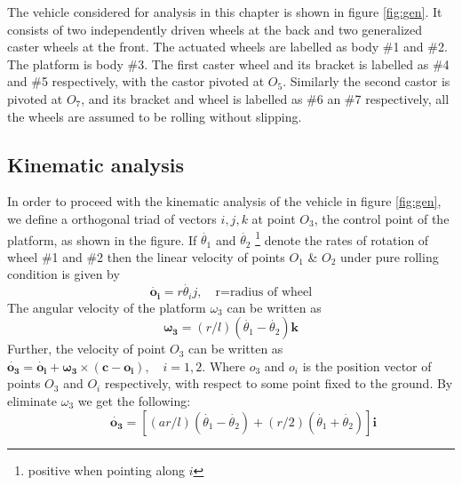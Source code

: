  The vehicle considered for analysis in this chapter is shown in figure \ref{fig:gen}. It consists of two independently driven wheels at the back and two generalized caster wheels at the front. The actuated wheels are labelled as body \#1 and \#2. The platform is body \#3. The first caster wheel and its bracket is labelled as \#4 and \#5 respectively, with the castor pivoted at $O_5$. Similarly the second castor is pivoted at $O_7$, and its bracket and wheel is labelled as \#6 an \#7 respectively, all the wheels are assumed to be rolling without slipping.  
\subsection{Kinematic analysis}
In order to proceed with the kinematic analysis of the vehicle in figure \ref{fig:gen}, we define a orthogonal triad of vectors ${i,j,k}$ at point $O_3$, the control point of the platform, as shown in the figure. If $\dot{\theta_1}$ and $\dot{\theta_2}$ \footnote{ positive when pointing along $i$} denote the rates of rotation of wheel \#1 and \#2 then the linear velocity of points $O_1$ \& $O_2$ under pure rolling condition is given by 
\begin{equation}
\label{velO1}
\bm{\dot{o_i}}=r\dot{\theta_i}j, \quad \text{r=radius of wheel}
\end{equation}
The angular velocity of the platform $\omega_3$ can be written as 
\begin{equation}
\label{omegaPlat}
\bm{\omega_3}=(r/l)(\dot{\theta_1}-\dot{\theta_2})\bm{k}
\end{equation}
Further, the velocity of point $O_3$ can be written as
$\bm{\dot{o_3}=\dot{o_i}+\omega_3 \times (c-o_i)}, \quad i=1,2$. Where $o_3 $ and $o_i$  is the position vector of points $O_3$ and $O_i$ respectively, with respect to some  point fixed to the ground. By eliminate $\omega_3$  we get the following:
\begin{equation}
\label{velPlat}
 \quad \quad \bm{\dot{o_3}}=[(ar/l)(\dot{\theta_1}-\dot{\theta_2})+(r/2)(\dot{\theta_1}+\dot{\theta_2})]\bm{i}
\end{equation}

